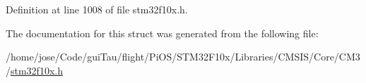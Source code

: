 Definition at line 1008 of file stm32f10x.\-h.



The documentation for this struct was generated from the following file\-:\begin{DoxyCompactItemize}
\item 
/home/jose/\-Code/gui\-Tau/flight/\-Pi\-O\-S/\-S\-T\-M32\-F10x/\-Libraries/\-C\-M\-S\-I\-S/\-Core/\-C\-M3/\hyperlink{stm32f10x_8h}{stm32f10x.\-h}\end{DoxyCompactItemize}
